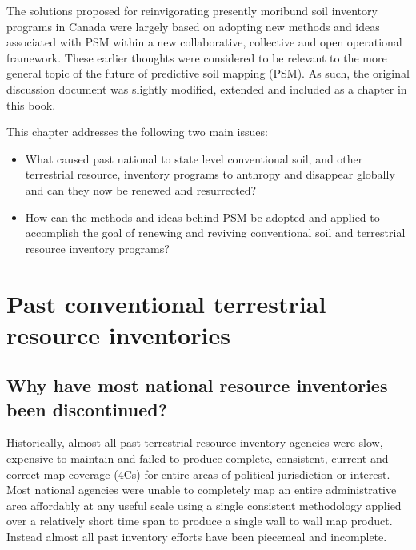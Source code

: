\documentclass[graybox,natbib,nospthms,UStrade]{svmono}
\begin{document}
The solutions proposed for reinvigorating presently moribund soil
inventory programs in Canada were largely based on adopting new methods
and ideas associated with PSM within a new collaborative, collective and
open operational framework. These earlier thoughts were considered to be
relevant to the more general topic of the future of predictive soil
mapping (PSM). As such, the original discussion document was slightly
modified, extended and included as a chapter in this book.

This chapter addresses the following two main issues:

\begin{itemize}
\item
  What caused past national to state level conventional
  soil, and other terrestrial resource, inventory programs to anthropy and disappear globally and can
  they now be renewed and resurrected?
\item
  How can the methods and ideas behind PSM be adopted and applied to
  accomplish the goal of renewing and reviving conventional soil and
  terrestrial resource inventory programs?
\end{itemize}

\hypertarget{past-conventional-terrestrial-resource-inventories}{%
\section{Past conventional terrestrial resource inventories}\label{past-conventional-terrestrial-resource-inventories}}

\hypertarget{why-have-most-national-resource-inventories-been-discontinued}{%
\subsection{Why have most national resource inventories been discontinued?}\label{why-have-most-national-resource-inventories-been-discontinued}}

Historically, almost all past terrestrial resource inventory agencies
were slow, expensive to maintain and failed to produce complete,
consistent, current and correct map coverage (4Cs) for entire areas of
political jurisdiction or interest. Most national agencies were unable
to completely map an entire administrative area affordably at any useful
scale using a single consistent methodology applied over a relatively
short time span to produce a single wall to wall map product. Instead
almost all past inventory efforts have been piecemeal and incomplete.
\end{document}
